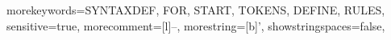 {morekeywords={SYNTAXDEF, FOR, START, TOKENS, DEFINE, RULES},
sensitive=true,
morecomment=[l]{--},
morestring=[b]',
showstringspaces=false,
}